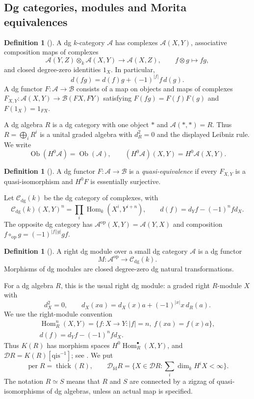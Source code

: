 \documentclass[12pt,a4paper,english,reqno]{amsart}
\theoremstyle{plain}
\theoremstyle{definition}
\newtheorem{dfn*}[thm]{Definition}
\numberwithin{equation}{section}
\def\Hom{\operatorname{Hom}}
\def\thick{\operatorname{thick}}
\def\perf{\operatorname{per}}
\def\calD{{\mathcal D}}
\def\ox{\otimes}
\def\Ds{\bigoplus}
\def\fd{\mathrm{fd}}
\begin{document}
\subsection{Dg categories, modules and Morita equivalences}\label{subsec:dg-definitions}

\begin{dfn*}[{\cite[Sections 2.2--2.3]{KellerDG}}]\label{def:dg-categories}
A dg $k$-category $\mathcal A$ has complexes $\mathcal A(X,Y)$,
associative composition maps of complexes
\[
 \mathcal A(Y,Z)\ox_k\mathcal A(X,Y)\longrightarrow\mathcal A(X,Z),
 \qquad f\ox g\longmapsto fg,
\]
and closed degree-zero identities $1_X$. In particular,
\[
 d(fg)=d(f)g+(-1)^{|f|}f\,d(g).
\]
A dg functor $F:\mathcal A\to\mathcal B$ consists of a map on
objects and maps of complexes
$F_{X,Y}:\mathcal A(X,Y)\to\mathcal B(FX,FY)$ satisfying
$F(fg)=F(f)F(g)$ and $F(1_X)=1_{FX}$.
\end{dfn*}

A dg algebra $R$ is a dg category with one object $*$ and
$\mathcal A(*,*)=R$. Thus $R=\Ds_iR^i$ is a unital graded algebra
with $d_R^2=0$ and the displayed Leibniz rule. We write
\[
 \operatorname{Ob}(H^0\mathcal A)=\operatorname{Ob}(\mathcal A),
 \qquad (H^0\mathcal A)(X,Y)=H^0\mathcal A(X,Y).
\]

\begin{dfn*}[{\cite[Section 2.3]{KellerDG}}]\label{def:quasi-equivalence}
A dg functor $F:\mathcal A\to\mathcal B$ is a
\emph{quasi-equivalence} if every $F_{X,Y}$ is a quasi-isomorphism
and $H^0F$ is essentially surjective.
\end{dfn*}

Let $\mathcal C_{\mathrm{dg}}(k)$ be the dg category of complexes,
with
\[
 \mathcal C_{\mathrm{dg}}(k)(X,Y)^n
 =\prod_i\Hom_k(X^i,Y^{i+n}),\qquad
 d(f)=d_Yf-(-1)^nf d_X.
\]
The opposite dg category has
$\mathcal A^{\mathrm{op}}(X,Y)=\mathcal A(Y,X)$ and composition
$f\circ_{\mathrm{op}}g=(-1)^{|f||g|}gf$.

\begin{dfn*}[{\cite[Section 3.1]{KellerDG}}]\label{def:dg-modules}
A right dg module over a small dg category $\mathcal A$ is a dg
functor
\[
 M:\mathcal A^{\mathrm{op}}\longrightarrow\mathcal C_{\mathrm{dg}}(k).
\]
Morphisms of dg modules are closed degree-zero dg natural
transformations.
\end{dfn*}

For a dg algebra $R$, this is the usual right dg module: a graded
right $R$-module $X$ with
\[
 d_X^2=0,\qquad d_X(xa)=d_X(x)a+(-1)^{|x|}x\,d_R(a).
\]
We use the right-module convention
\[
 \begin{gathered}
\Hom_R^n(X,Y)=\{f:X\to Y:|f|=n,\ f(xa)=f(x)a\},\\
 d(f)=d_Yf-(-1)^nf d_X.
\end{gathered}
\]
Thus $K(R)$ has morphism spaces $H^0\Hom_R^\bullet(X,Y)$, and
$\calD R=K(R)[\mathrm{qis}^{-1}]$; see
\cite[Section 3.2]{KellerDG}. We put
\[
 \perf R=\thick(R),\qquad
 \calD_{\fd}R=\{X\in\calD R:\sum_i\dim_kH^iX<\infty\}.
\]
The notation $R\simeq S$ means that $R$ and $S$ are connected
by a zigzag of quasi-isomorphisms of dg algebras, unless an actual map is specified.
\end{document}
